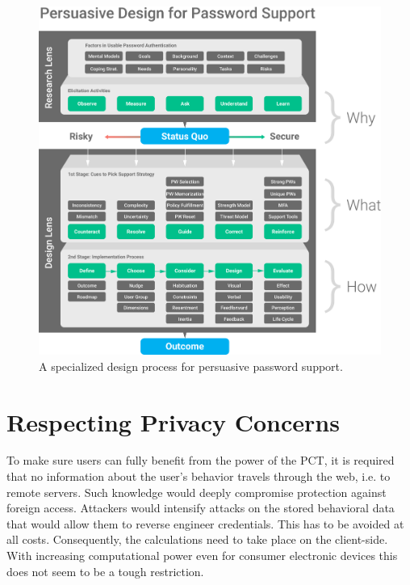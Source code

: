 
\begin{figure}
	\centering
	\includegraphics[width=\linewidth]{figures/pst/PerdesPassup}
	\caption{\label{fig:pst:passup.old} A specialized design process for persuasive password support.}
\end{figure}

\section{Respecting Privacy Concerns}
To make sure users can fully benefit from the power of the PCT, it is required that no information about the user's behavior travels through the web, i.e. to remote servers. Such knowledge would deeply compromise protection against foreign access. Attackers would intensify attacks on the stored behavioral data that would allow them to reverse engineer credentials. This has to be avoided at all costs. Consequently, the calculations need to take place on the client-side. With increasing computational power even for consumer electronic devices this does not seem to be a tough restriction. 

